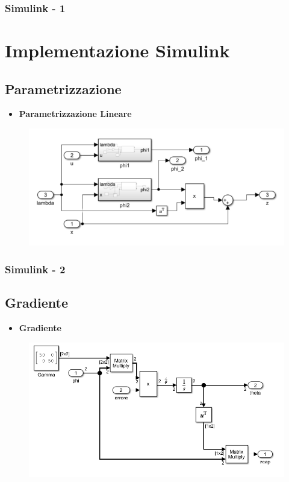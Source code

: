 \documentclass{beamer}
\begin{document}
\begin{frame}
	\frametitle{Simulink - 1}%
\section{Implementazione Simulink}
\subsection{Parametrizzazione}
\begin{itemize}
	\item \textbf{Parametrizzazione Lineare}
\end{itemize}
	\begin{figure}
		\includegraphics[scale=0.5]{2022-05-09-17-02-47.png} %
	\end{figure}
\end{frame}
\begin{frame}
	\frametitle{Simulink - 2}%
	\subsection{Gradiente}
	\begin{itemize}
		\item \textbf{Gradiente}
	\end{itemize}
	\begin{figure}
		\includegraphics[scale=0.5]{2022-05-09-17-07-35.png}%
	\end{figure}
\end{frame}
\end{document}
